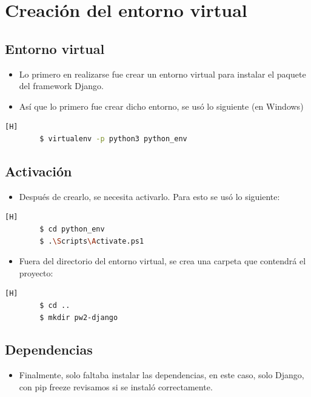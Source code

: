 \documentclass{article}
\begin{document}
    \section{Creación del entorno virtual}

        \subsection{Entorno virtual}
        \begin{itemize}	
            \item Lo primero en realizarse fue crear un entorno virtual para instalar el paquete del framework Django.
            \item Así que lo primero fue crear dicho entorno, se usó lo siguiente (en Windows)
        \end{itemize}
 
        \begin{lstlisting}[language=bash,caption={Creación del entorno virtual}][H]
        $ virtualenv -p python3 python_env
        \end{lstlisting}

        \subsection{Activación}
        \begin{itemize}	
            \item Después de crearlo, se necesita activarlo. Para esto se usó lo siguiente:
	\end{itemize}

        \begin{lstlisting}[language=bash,caption={Activación del entorno virtual}][H]
        $ cd python_env
        $ .\Scripts\Activate.ps1
        \end{lstlisting}

        \begin{itemize}	
            \item Fuera del directorio del entorno virtual, se crea una carpeta que contendrá el proyecto:
	\end{itemize}
        \begin{lstlisting}[language=bash,caption={Directorio de trabajo del proyecto}][H]
        $ cd ..
        $ mkdir pw2-django
        \end{lstlisting}

        \subsection{Dependencias}
        \begin{itemize}	
            \item Finalmente, solo faltaba instalar las dependencias, en este caso, solo Django, con pip freeze revisamos si se instaló correctamente.
	\end{itemize}
\end{document}
